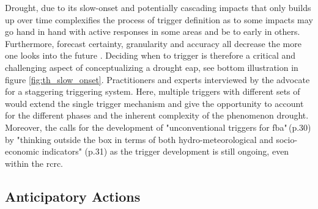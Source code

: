 Drought, due to its slow-onset and potentially cascading impacts that only builds up over time complexifies the process of trigger definition as  to some impacts may go hand in hand with active responses in some areas and be to early in others. Furthermore, forecast certainty, granularity and accuracy all decrease the more one looks into the future \autocite{rcrcForecastbasedFinancingEarly2020}. Deciding when to trigger is therefore a critical and challenging aspect of conceptualizing a drought \acrshort{eap}, see bottom illustration in figure \ref{fig:th_slow_onset}. Practitioners and experts interviewed by the \textcite{rcrcForecastbasedFinancingEarly2020} advocate for a staggering triggering system. Here, multiple triggers with different sets of  would extend the single trigger mechanism and give the opportunity to account for the different phases and the inherent complexity of the phenomenon drought. Moreover, the \textcite{rcrcForecastbasedFinancingEarly2020} calls for the development of "unconventional triggers for \acrfull{fba}"\,(p.30) by "thinking outside the box in terms of both hydro-meteorological and socio-economic indicators" (p.31) as the trigger development is still ongoing, even within the \acrshort{rcrc}.


\subsection{Anticipatory Actions}

